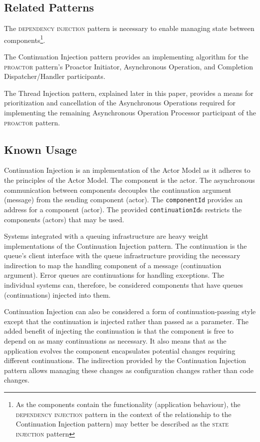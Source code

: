 \documentclass[prodmode]{style/acmlarge}
\begin{document}
\subsection{Related Patterns}

The \textsc{dependency injection} pattern \cite{ioc} is necessary to enable
managing state between components\footnote{As the components contain the
functionality (application behaviour), the \textsc{dependency injection} pattern
in the context of the relationship to the Continuation Injection pattern) may
better be described as the \textsc{state injection} pattern}.

The Continuation Injection pattern provides an implementing algorithm for the
\textsc{proactor} pattern's Proactor Initiator, Asynchronous Operation, and
Completion Dispatcher/Handler participants.

The Thread Injection pattern, explained later in this paper, provides a means for
prioritization and cancellation of the Asynchronous Operations required for
implementing the remaining Asynchronous Operation Processor participant of the
\textsc{proactor} pattern.


\subsection{Known Usage}

Continuation Injection is an implementation of the Actor Model \cite{actors} as
it adheres to the principles of the Actor Model.  The component is the actor.
The asynchronous communication between components decouples the continuation
argument (message) from the sending component (actor).  The \texttt{componentId}
provides an address for a component (actor).  The provided
\texttt{continuationId}s restricts the components (actors) that may be used.

Systems integrated with a queuing infrastructure are heavy weight
implementations of the Continuation Injection pattern.  The continuation is the
queue's client interface with the queue infrastructure providing the necessary
indirection to map the handling component of a message (continuation argument).
Error queues are continuations for handling exceptions.  The individual systems
can, therefore, be considered components that have queues (continuations)
injected into them.

Continuation Injection can also be considered a form of continuation-passing
style \cite{continuations} except that the continuation is injected rather than
passed as a parameter.  The added benefit of injecting the continuation is that
the component is free to depend on as many continuations as necessary.  It also
means that as the application evolves the component encapsulates potential
changes requiring different continuations.  The indirection provided by the
Continuation Injection pattern allows managing these changes as configuration
changes rather than code changes.
\end{document}
